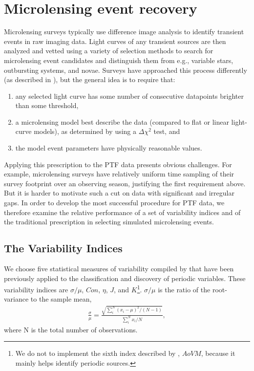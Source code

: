 \documentclass{emulateapj}
\begin{document}
\section{Microlensing event recovery} \label{sec:event_recovery}
Microlensing surveys typically use difference image analysis \citep{alard1998} to identify transient events in raw imaging data. Light curves of any transient sources are then analyzed and vetted using a variety of selection methods to search for microlensing event candidates and distinguish them from e.g., variable stars, outbursting systems, and novae. Surveys have approached this process differently (as described in \citealt{ogle_optical_depth, con_idx, alcock2000, macho_detection_efficiency, udalski03,  hamadache2009, wyrzykowski2009, sumi2011}), but the general idea is to require that: 
\begin{enumerate}
	\item any selected light curve has some number of consecutive datapoints brighter than some threshold,
	\item a microlensing model best describe the data (compared to flat or linear light-curve models), as determined by using a $\Delta\chi^2$ test, and
	\item the model event parameters have physically reasonable values.
\end{enumerate}

Applying this prescription to the PTF data presents obvious challenges. For example, microlensing surveys have relatively uniform time sampling of their survey footprint over an observing season, justifying the first requirement above. But it is harder to motivate such a cut on data with significant and irregular gaps. In order to develop the most successful procedure for PTF data, we therefore examine the relative performance of a set of variability indices and of the traditional prescription in selecting simulated microlensing events.

\subsection{The Variability Indices} %
We choose five statistical measures of variability compiled by \cite{shin2009} that have been previously applied to the classification and discovery of periodic variables. These variability indices are $\sigma/\mu$, $Con$, $\eta$, $J$, and $K$\footnote{We do not to implement the sixth index described by \cite{shin2009}, $AoVM$, because it mainly helps identify periodic sources.}. $\sigma/\mu$ is the ratio of the root-variance to the sample mean, 
\begin{align}
	\frac{\sigma}{\mu} = \frac{\sqrt{\sum^N_i (x_i - \mu)^2 / (N-1)}}{\sum^N_i x_i/N},
\end{align}
where N is the total number of observations. 
\end{document}
